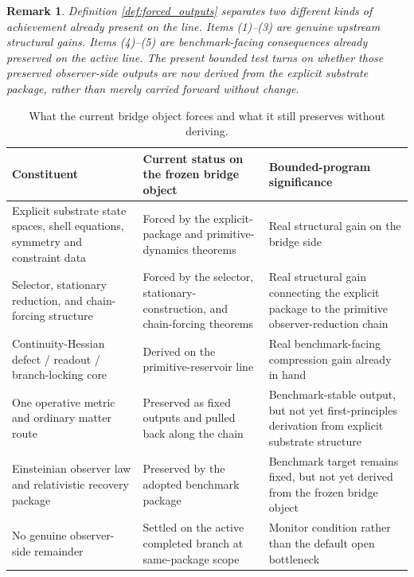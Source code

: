 \documentclass[11pt]{article}
\newtheorem{remark}{Remark}
\begin{document}
\begin{remark}
Definition \ref{def:forced_outputs} separates two different kinds of achievement already present on the line. Items (1)--(3) are genuine upstream structural gains. Items (4)--(5) are benchmark-facing consequences already preserved on the active line. The present bounded test turns on whether those preserved observer-side outputs are now \emph{derived} from the explicit substrate package, rather than merely carried forward without change.
\end{remark}

\begin{table}[ht]
\centering
\renewcommand{\arraystretch}{1.2}
\begin{tabular}{>{\raggedright\arraybackslash}p{} >{\raggedright\arraybackslash}p{} >{\raggedright\arraybackslash}p{}}
\toprule
\textbf{Constituent} & \textbf{Current status on the frozen bridge object} & \textbf{Bounded-program significance} \\
\midrule
Explicit substrate state spaces, shell equations, symmetry and constraint data & Forced by the explicit-package and primitive-dynamics theorems & Real structural gain on the bridge side \\
Selector, stationary reduction, and chain-forcing structure & Forced by the selector, stationary-construction, and chain-forcing theorems & Real structural gain connecting the explicit package to the primitive observer-reduction chain \\
Continuity-Hessian defect / readout / branch-locking core & Derived on the primitive-reservoir line & Real benchmark-facing compression gain already in hand \\
One operative metric and ordinary matter route & Preserved as fixed outputs and pulled back along the chain & Benchmark-stable output, but not yet first-principles derivation from explicit substrate structure \\
Einsteinian observer law and relativistic recovery package & Preserved by the adopted benchmark package & Benchmark target remains fixed, but not yet derived from the frozen bridge object \\
No genuine observer-side remainder & Settled on the active completed branch at same-package scope & Monitor condition rather than the default open bottleneck \\
\bottomrule
\end{tabular}
\caption{What the current bridge object forces and what it still preserves without deriving.}
\label{tab:forced_vs_preserved}
\end{table}
\end{document}
